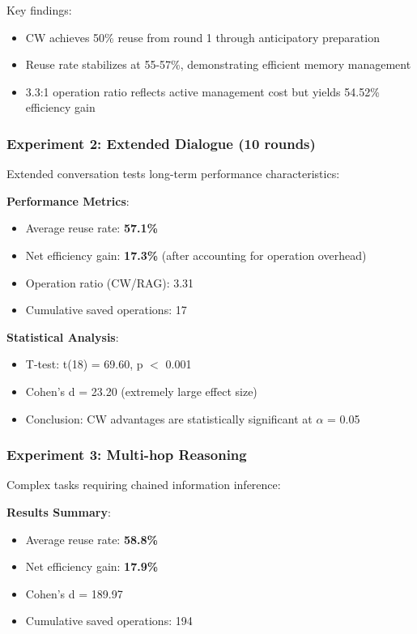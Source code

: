 \documentclass[10pt,twocolumn]{article}
\begin{document}
Key findings:
\begin{itemize}
\item CW achieves 50\% reuse from round 1 through anticipatory preparation
\item Reuse rate stabilizes at 55-57\%, demonstrating efficient memory management
\item 3.3:1 operation ratio reflects active management cost but yields 54.52\% efficiency gain
\end{itemize}

\subsubsection{Experiment 2: Extended Dialogue (10 rounds)}

Extended conversation tests long-term performance characteristics:

\textbf{Performance Metrics}:
\begin{itemize}
\item Average reuse rate: \textbf{57.1\%}
\item Net efficiency gain: \textbf{17.3\%} (after accounting for operation overhead)
\item Operation ratio (CW/RAG): 3.31
\item Cumulative saved operations: 17
\end{itemize}

\textbf{Statistical Analysis}:
\begin{itemize}
\item T-test: t(18) = 69.60, p $<$ 0.001
\item Cohen's d = 23.20 (extremely large effect size)
\item Conclusion: CW advantages are statistically significant at $\alpha$ = 0.05
\end{itemize}

\subsubsection{Experiment 3: Multi-hop Reasoning}

Complex tasks requiring chained information inference:

\textbf{Results Summary}:
\begin{itemize}
\item Average reuse rate: \textbf{58.8\%}
\item Net efficiency gain: \textbf{17.9\%}
\item Cohen's d = 189.97
\item Cumulative saved operations: 194
\end{itemize}
\end{document}
